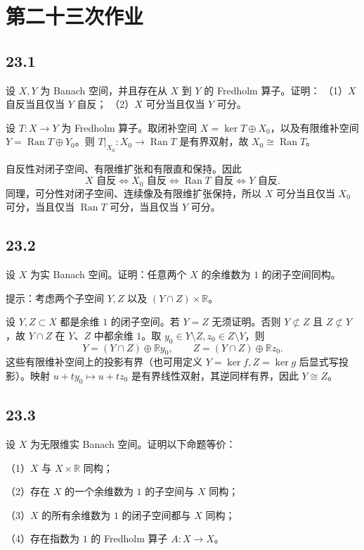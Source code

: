 \section{第二十三次作业}

\subsection*{23.1}
\begin{problem}
设 $X,Y$ 为 Banach 空间，并且存在从 $X$ 到 $Y$ 的 Fredholm 算子。证明：
（1）$X$ 自反当且仅当 $Y$ 自反；
（2）$X$ 可分当且仅当 $Y$ 可分。
\end{problem}

设 $T:X\to Y$ 为 Fredholm 算子。取闭补空间
$X=\ker T\oplus X_0$，以及有限维补空间
$Y=\operatorname{Ran}T\oplus Y_0$。则 $T|_{X_0}:X_0\to\operatorname{Ran}T$ 是有界双射，故
$X_0\cong\operatorname{Ran}T$。

自反性对闭子空间、有限维扩张和有限直和保持。因此
\[
 X\text{ 自反}\iff X_0\text{ 自反}
 \iff\operatorname{Ran}T\text{ 自反}\iff Y\text{ 自反}.
\]
同理，可分性对闭子空间、连续像及有限维扩张保持，所以
$X$ 可分当且仅当 $X_0$ 可分，当且仅当 $\operatorname{Ran}T$ 可分，当且仅当 $Y$ 可分。

\subsection*{23.2}
\begin{problem}
设 $X$ 为实 Banach 空间。证明：任意两个 $X$ 的余维数为 $1$ 的闭子空间同构。

提示：考虑两个子空间 $Y,Z$ 以及 $(Y\cap Z)\times\mathbb R$。
\end{problem}

设 $Y,Z\subset X$ 都是余维 $1$ 的闭子空间。若 $Y=Z$ 无须证明。否则 $Y\not\subset Z$ 且
$Z\not\subset Y$，故 $Y\cap Z$ 在 $Y$、$Z$ 中都余维 $1$。取
$y_0\in Y\setminus Z,z_0\in Z\setminus Y$，则
\[
 Y=(Y\cap Z)\oplus\mathbb Ry_0,\qquad
 Z=(Y\cap Z)\oplus\mathbb Rz_0.
\]
这些有限维补空间上的投影有界（也可用定义 $Y=\ker f,Z=\ker g$ 后显式写投影）。映射
$u+ty_0\mapsto u+tz_0$ 是有界线性双射，其逆同样有界，因此 $Y\cong Z$。

\subsection*{23.3}
\begin{problem}
设 $X$ 为无限维实 Banach 空间。证明以下命题等价：

（1）$X$ 与 $X\times\mathbb R$ 同构；

（2）存在 $X$ 的一个余维数为 $1$ 的子空间与 $X$ 同构；

（3）$X$ 的所有余维数为 $1$ 的闭子空间都与 $X$ 同构；

（4）存在指数为 $1$ 的 Fredholm 算子 $A:X\to X$。
\end{problem}

